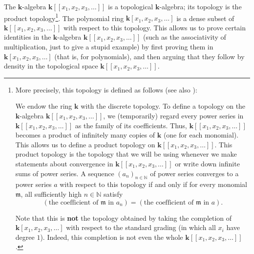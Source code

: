 \documentclass
[numbers=enddot,12pt,final,onecolumn,notitlepage,abstracton]{scrartcl}%
\theoremstyle{definition}
\begin{document}
The $\mathbf{k}$-algebra $\mathbf{k}\left[  \left[  x_{1},x_{2},x_{3}%
,\ldots\right]  \right]  $ is a topological $\mathbf{k}$-algebra; its topology
is the product topology\footnote{More precisely, this topology is defined as
follows (see also \cite[proof of Corollary 2.6.11]{Reiner}):
\par
We endow the ring $\mathbf{k}$ with the discrete topology. To define a
topology on the $\mathbf{k}$-algebra $\mathbf{k}\left[  \left[  x_{1}%
,x_{2},x_{3},\ldots\right]  \right]  $, we (temporarily) regard every power
series in $\mathbf{k}\left[  \left[  x_{1},x_{2},x_{3},\ldots\right]  \right]
$ as the family of its coefficients. Thus, $\mathbf{k}\left[  \left[
x_{1},x_{2},x_{3},\ldots\right]  \right]  $ becomes a product of infinitely
many copies of $\mathbf{k}$ (one for each monomial). This allows us to define
a product topology on $\mathbf{k}\left[  \left[  x_{1},x_{2},x_{3}%
,\ldots\right]  \right]  $. This product topology is the topology that we will
be using whenever we make statements about convergence in $\mathbf{k}\left[
\left[  x_{1},x_{2},x_{3},\ldots\right]  \right]  $ or write down infinite
sums of power series. A sequence $\left(  a_{n}\right)  _{n\in\mathbb{N}}$ of
power series converges to a power series $a$ with respect to this topology if
and only if for every monomial $\mathfrak{m}$, all sufficiently high
$n\in\mathbb{N}$ satisfy%
\[
\left(  \text{the coefficient of }\mathfrak{m}\text{ in }a_{n}\right)
=\left(  \text{the coefficient of }\mathfrak{m}\text{ in }a\right)  .
\]
\par
Note that this is \textbf{not} the topology obtained by taking the completion
of $\mathbf{k}\left[  x_{1},x_{2},x_{3},\ldots\right]  $ with respect to the
standard grading (in which all $x_{i}$ have degree $1$). Indeed, this
completion is not even the whole $\mathbf{k}\left[  \left[  x_{1},x_{2}%
,x_{3},\ldots\right]  \right]  $.}. The polynomial ring $\mathbf{k}\left[
x_{1},x_{2},x_{3},\ldots\right]  $ is a dense subset of $\mathbf{k}\left[
\left[  x_{1},x_{2},x_{3},\ldots\right]  \right]  $ with respect to this
topology. This allows us to prove certain identities in the $\mathbf{k}%
$-algebra $\mathbf{k}\left[  \left[  x_{1},x_{2},x_{3},\ldots\right]  \right]
$ (such as the associativity of multiplication, just to give a stupid example)
by first proving them in $\mathbf{k}\left[  x_{1},x_{2},x_{3},\ldots\right]  $
(that is, for polynomials), and then arguing that they follow by density in
the topological space $\mathbf{k}\left[  \left[  x_{1},x_{2},x_{3}%
,\ldots\right]  \right]  $.
\end{document}
